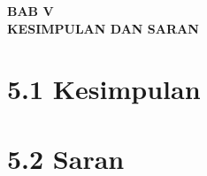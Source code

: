 \begin{center}
  \textbf{BAB V} \\[0.5em]
  \textbf{KESIMPULAN DAN SARAN}
\end{center}

\section*{5.1 Kesimpulan}

\section*{5.2 Saran}


